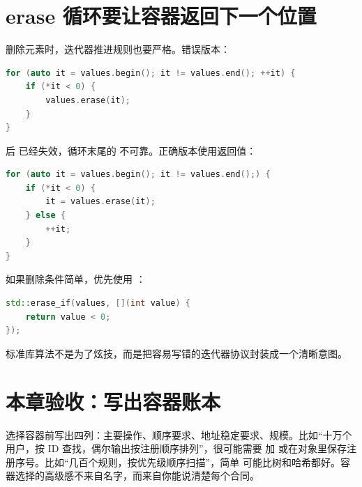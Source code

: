 \section{erase 循环要让容器返回下一个位置}

删除元素时，迭代器推进规则也要严格。错误版本：

\begin{lstlisting}[language=C++,caption={删除后继续使用失效迭代器}]
for (auto it = values.begin(); it != values.end(); ++it) {
    if (*it < 0) {
        values.erase(it);
    }
}
\end{lstlisting}

 后  已经失效，循环末尾的  不可靠。正确版本使用返回值：

\begin{lstlisting}[language=C++,caption={erase 返回下一个有效位置}]
for (auto it = values.begin(); it != values.end();) {
    if (*it < 0) {
        it = values.erase(it);
    } else {
        ++it;
    }
}
\end{lstlisting}

如果删除条件简单，优先使用 ：

\begin{lstlisting}[language=C++,caption={用标准库表达删除条件}]
std::erase_if(values, [](int value) {
    return value < 0;
});
\end{lstlisting}

标准库算法不是为了炫技，而是把容易写错的迭代器协议封装成一个清晰意图。

\section{本章验收：写出容器账本}

选择容器前写出四列：主要操作、顺序要求、地址稳定要求、规模。比如“十万个用户，按 ID 查找，偶尔输出按注册顺序排列”，很可能需要  加  或在对象里保存注册序号。比如“几百个规则，按优先级顺序扫描”，简单  可能比树和哈希都好。容器选择的高级感不来自名字，而来自你能说清楚每个合同。
